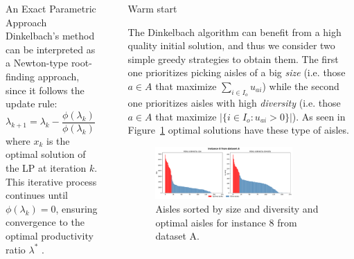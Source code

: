 \documentclass[final]{beamer}
\newlength{\sepwidth}
\newlength{\colwidth}
\newcommand{\separatorcolumn}{\begin{column}{\sepwidth}\end{column}}
\begin{document}
\begin{frame}[t]
\begin{columns}[t]
\begin{column}{\colwidth}
\begin{block}{An Exact Parametric Approach}
Dinkelbach’s method can be interpreted as a Newton-type root-finding approach, since it follows the update rule:
\[
\lambda_{k+1} = \lambda_k - \frac{\phi(\lambda_k)}{\phi(\lambda_k)} = \lambda_{k} + \frac{\phi'(\lambda_k)}{g(x_k)},
\]
where $x_k$ is the optimal solution of the LP at iteration $k$. 
This iterative process continues until $\phi(\lambda_k) = 0$, ensuring convergence to the optimal productivity ratio $\lambda^*$ \cite{You2009Dinkelbach}.

\end{block}


  

\end{column}

\separatorcolumn

\begin{column}{\colwidth}

  \begin{block}{Warm start}

    The Dinkelbach algorithm can benefit from a high quality initial solution, and thus we consider two simple greedy strategies to obtain them.
    The first one prioritizes picking aisles of a big \textit{size} (i.e. those $a \in A$ that maximize $\sum_{i \in I_o} u_{ai}$) while the second one prioritizes aisles
    with high \textit{diversity} (i.e. those $a \in A$ that maximize $|\{i \in I_o : u_{ai} > 0\}|$). As seen in Figure~\ref{fig:aisles_greedy} optimal solutions have these type of aisles.
    
    \begin{figure}
      \centering
      \includegraphics[width=0.8\textwidth]{greedy_instance_a.pdf}
      \caption{Aisles sorted by size and diversity and optimal aisles for instance 8 from dataset A.}
      \label{fig:aisles_greedy}
    \end{figure}


\end{block}
\end{column}
\end{columns}
\end{frame}
\end{document}
